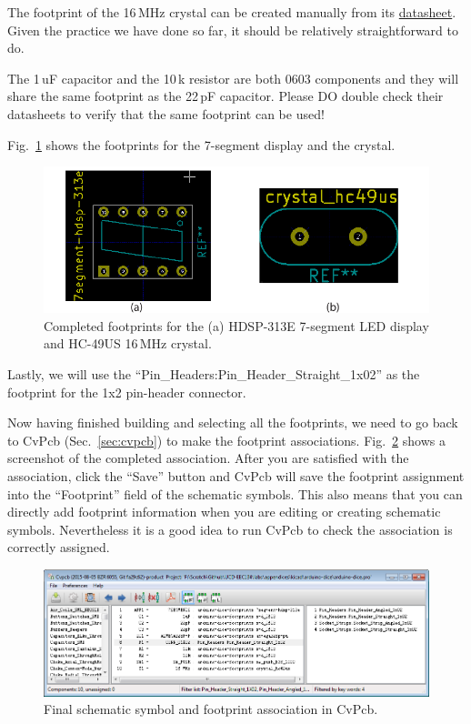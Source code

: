 \documentclass[12pt,letterpaper]{scrartcl}
\begin{document}
The footprint of the 16\,MHz crystal can be created manually from its \href{http://media.digikey.com/pdf/Data\%20Sheets/Citizen\%20PDFs/HC49US.pdf}{datasheet}. Given the practice we have done so far, it should be relatively straightforward to do. 

The 1\,uF capacitor and the 10\,k resistor are both 0603 components and they will share the same footprint as the 22\,pF capacitor. Please DO double check their datasheets to verify that the same footprint can be used!

Fig.~\ref{fig:other-footprints-final} shows the footprints for the 7-segment display and the crystal. 
	\begin{figure}[hp]
		\centering
		\includegraphics{other-footprints-final}
		\caption{Completed footprints for the (a) HDSP-313E 7-segment LED display and HC-49US 16\,MHz crystal.}
		\label{fig:other-footprints-final}
	\end{figure}

Lastly, we will use the ``Pin\_Headers:Pin\_Header\_Straight\_1x02'' as the footprint for the 1x2 pin-header connector. 

Now having finished building and selecting all the footprints, we need to go back to CvPcb (Sec.~\ref{sec:cvpcb}) to make the footprint associations. Fig.~\ref{fig:cvpcb-final} shows a screenshot of the completed association. After you are satisfied with the association, click the ``Save'' button and CvPcb will save the footprint assignment into the ``Footprint'' field of the schematic symbols. This also means that you can directly add footprint information when you are editing or creating schematic symbols. Nevertheless it is a good idea to run CvPcb to check the association is correctly assigned. 

	\begin{figure}[hp]
		\centering
		\includegraphics[width=6in]{cvpcb-final}
		\caption{Final schematic symbol and footprint association in CvPcb.}
		\label{fig:cvpcb-final}
	\end{figure}
\end{document}
